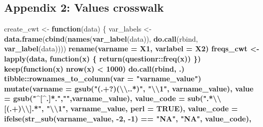 \documentclass[12pt,]{article}
\newenvironment{Shaded}{\begin{snugshade}}{\end{snugshade}}
\newcommand{\CharTok}[1]{\textcolor[rgb]{0.31,0.60,0.02}{#1}}
\newcommand{\ControlFlowTok}[1]{\textcolor[rgb]{0.13,0.29,0.53}{\textbf{#1}}}
\newcommand{\DataTypeTok}[1]{\textcolor[rgb]{0.13,0.29,0.53}{#1}}
\newcommand{\DecValTok}[1]{\textcolor[rgb]{0.00,0.00,0.81}{#1}}
\newcommand{\KeywordTok}[1]{\textcolor[rgb]{0.13,0.29,0.53}{\textbf{#1}}}
\newcommand{\NormalTok}[1]{#1}
\newcommand{\OperatorTok}[1]{\textcolor[rgb]{0.81,0.36,0.00}{\textbf{#1}}}
\newcommand{\OtherTok}[1]{\textcolor[rgb]{0.56,0.35,0.01}{#1}}
\newcommand{\StringTok}[1]{\textcolor[rgb]{0.31,0.60,0.02}{#1}}
\begin{document}
\normalsize

\hypertarget{appendix2}{%
\subsection{Appendix 2: Values crosswalk}\label{appendix2}}

\scriptsize

\begin{Shaded}
\begin{Highlighting}[]
\NormalTok{create_cwt <-}\StringTok{ }\ControlFlowTok{function}\NormalTok{(data) \{}
\NormalTok{  var_labels <-}\StringTok{ }\KeywordTok{data.frame}\NormalTok{(}\KeywordTok{cbind}\NormalTok{(}\KeywordTok{names}\NormalTok{(}\KeywordTok{var_label}\NormalTok{(data)), }\KeywordTok{do.call}\NormalTok{(rbind, }\KeywordTok{var_label}\NormalTok{(data)))) }\OperatorTok{%
\StringTok{    }\KeywordTok{rename}\NormalTok{(}\DataTypeTok{varname =}\NormalTok{ X1, }\DataTypeTok{varlabel =}\NormalTok{ X2)}
\NormalTok{  freqs_cwt <-}\StringTok{ }\KeywordTok{lapply}\NormalTok{(data, }\ControlFlowTok{function}\NormalTok{(x) \{ }\KeywordTok{return}\NormalTok{(questionr}\OperatorTok{::}\KeywordTok{freq}\NormalTok{(x)) \}) }\OperatorTok{%
\StringTok{    }\KeywordTok{keep}\NormalTok{(}\ControlFlowTok{function}\NormalTok{(x) }\KeywordTok{nrow}\NormalTok{(x) }\OperatorTok{<}\StringTok{ }\DecValTok{1000}\NormalTok{) }\OperatorTok{%
\StringTok{    }\KeywordTok{do.call}\NormalTok{(rbind, .) }\OperatorTok{%
\StringTok{    }\NormalTok{tibble}\OperatorTok{::}\KeywordTok{rownames_to_column}\NormalTok{(}\DataTypeTok{var =} \StringTok{"varname_value"}\NormalTok{) }\OperatorTok{%
\StringTok{    }\KeywordTok{mutate}\NormalTok{(}\DataTypeTok{varname =} \KeywordTok{gsub}\NormalTok{(}\StringTok{"(.+?)(}\CharTok{\textbackslash{}\textbackslash{}}\StringTok{..*)"}\NormalTok{, }\StringTok{"}\CharTok{\textbackslash{}\textbackslash{}}\StringTok{1"}\NormalTok{, varname_value),}
           \DataTypeTok{value =} \KeywordTok{gsub}\NormalTok{(}\StringTok{"^[^.]*."}\NormalTok{,}\StringTok{""}\NormalTok{,varname_value),}
           \DataTypeTok{value_code =} \KeywordTok{sub}\NormalTok{(}\StringTok{".*}\CharTok{\textbackslash{}\textbackslash{}}\StringTok{[(.+)}\CharTok{\textbackslash{}\textbackslash{}}\StringTok{].*"}\NormalTok{, }\StringTok{"}\CharTok{\textbackslash{}\textbackslash{}}\StringTok{1"}\NormalTok{, varname_value, }\DataTypeTok{perl =} \OtherTok{TRUE}\NormalTok{),}
           \DataTypeTok{value_code =} \KeywordTok{ifelse}\NormalTok{(}\KeywordTok{str_sub}\NormalTok{(varname_value, }\DecValTok{-2}\NormalTok{, }\DecValTok{-1}\NormalTok{) }\OperatorTok{==}\StringTok{ "NA"}\NormalTok{, }\StringTok{"NA"}\NormalTok{, value_code),}
}}}}}
\end{Highlighting}
\end{Shaded}
\end{document}
